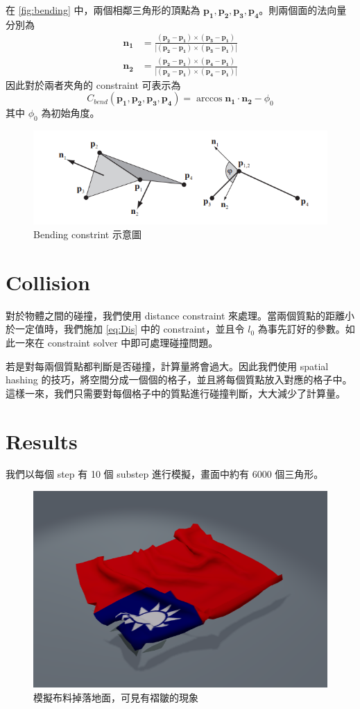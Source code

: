 \documentclass{article}
\begin{document}
在 \autoref{fig:bending} 中，兩個相鄰三角形的頂點為 $\mathbf{p_1}, \mathbf{p_2}, \mathbf{p_3}, \mathbf{p_4}$。則兩個面的法向量分別為
\begin{align}
  \mathbf{n_1} & = \frac{(\mathbf{p_2}-\mathbf{p_1})\times(\mathbf{p_3}-\mathbf{p_1})}{|(\mathbf{p_2}-\mathbf{p_1})\times(\mathbf{p_3}-\mathbf{p_1})|} \\
  \mathbf{n_2} & = \frac{(\mathbf{p_2}-\mathbf{p_1})\times(\mathbf{p_4}-\mathbf{p_1})}{|(\mathbf{p_2}-\mathbf{p_1})\times(\mathbf{p_4}-\mathbf{p_1})|}
\end{align}
因此對於兩者夾角的 constraint 可表示為
\[
C_{bend}( \mathbf{p_1}, \mathbf{p_2}, \mathbf{p_3}, \mathbf{p_4}) = \arccos{\mathbf{n_1} \cdot \mathbf{n_2}} - \phi_0
\]
其中 $\phi_0$ 為初始角度。

\begin{figure}[!ht]
  \centering
  \includegraphics[width=0.6\linewidth]{figures/bending.png}
  \caption{Bending constrint 示意圖}
  \label{fig:bending}
\end{figure}

\section*{Collision}

對於物體之間的碰撞，我們使用 distance constraint 來處理。當兩個質點的距離小於一定值時，我們施加 \ref*{eq:Dis} 中的 constraint，並且令 $l_0$ 為事先訂好的參數。如此一來在 constraint solver 中即可處理碰撞問題。

若是對每兩個質點都判斷是否碰撞，計算量將會過大。因此我們使用 spatial hashing 的技巧，將空間分成一個個的格子，並且將每個質點放入對應的格子中。這樣一來，我們只需要對每個格子中的質點進行碰撞判斷，大大減少了計算量。

\section*{Results}

我們以每個 step 有 10 個 substep 進行模擬，畫面中約有 6000 個三角形。

\begin{figure}[!ht]
  \centering
  \includegraphics[width=0.6\linewidth]{figures/flag1.png}
  \caption{模擬布料掉落地面，可見有褶皺的現象}
\end{figure}
\end{document}

